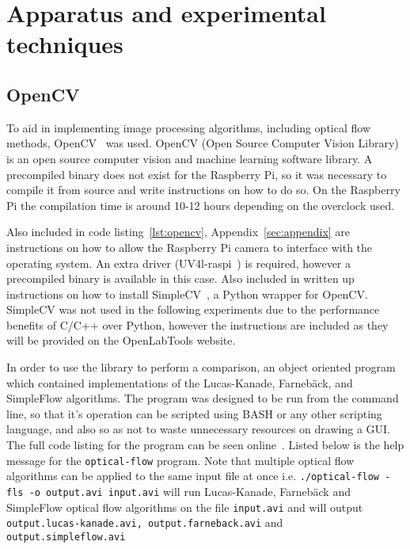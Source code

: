 \chapter{Apparatus and experimental techniques}
\label{sec:apparatus}

\ifpdf
    \graphicspath{{Section3/Figs/Raster/}{Section3/Figs/PDF/}{Section3/Figs/}}
\else
    \graphicspath{{Section3/Figs/Vector/}{Section3/Figs/}}
\fi

\section{OpenCV}

To aid in implementing image processing algorithms, including optical flow methods, OpenCV~\cite{opencv} was used. OpenCV (Open Source Computer Vision Library) is an open source computer vision and machine learning software library. A precompiled binary does not exist for the Raspberry Pi, so it was necessary to compile it from source and write instructions on how to do so. On the Raspberry Pi the compilation time is around 10-12 hours depending on the overclock used. 

Also included in code listing~\ref{lst:opencv}, Appendix~\ref{sec:appendix} are instructions on how to allow the Raspberry Pi camera to interface with the operating system. An extra driver (UV4l-raspi~\cite{uv4l}) is required, however a precompiled binary is available in this case. Also included in written up instructions on how to install SimpleCV~\cite{simplecv}, a Python wrapper for OpenCV. SimpleCV was not used in the following experiments due to the performance benefits of C/C++ over Python, however the instructions are included as they will be provided on the OpenLabTools website.

In order to use the library to perform a comparison, an object oriented program which contained implementations of the Lucas-Kanade, Farnebäck, and SimpleFlow algorithms. The program was designed to be run from the command line, so that it's operation can be scripted using BASH or any other scripting language, and also so as not to waste unnecessary resources on drawing a GUI. The full code listing for the program can be seen online~\cite{github}. Listed below is the help message for the \verb|optical-flow| program. Note that multiple optical flow algorithms can be applied to the same input file at once i.e. \verb|./optical-flow -fls -o output.avi input.avi| will run Lucas-Kanade, Farnebäck and SimpleFlow optical flow algorithms on the file \verb|input.avi| and will output \verb|output.lucas-kanade.avi, output.farneback.avi| and \verb|output.simpleflow.avi|
 
